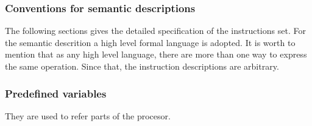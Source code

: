 \subsubsection{Conventions for semantic descriptions}
\label{sssec:semantic_conventions}

The following sections gives the detailed specification of the instructions set. For the semantic descrition
a high level formal language is adopted. It is worth to mention that as any high level language,
there are more than one way to express the same operation. Since that, the instruction descriptions
are arbitrary.

\subsubsection{Predefined variables}
\label{sssec:predefined_variables}
They are used to refer parts of the procesor.


